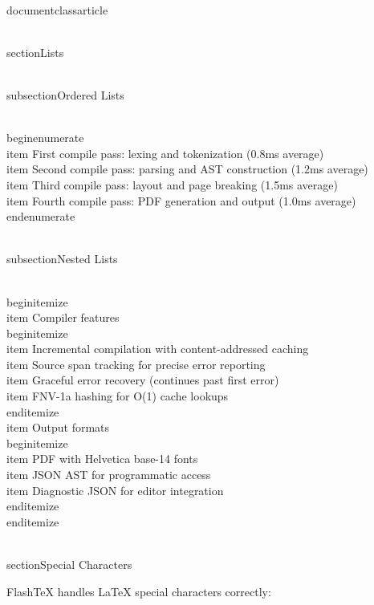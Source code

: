 \\documentclass{article}
\begin{document}
\\section{Lists}

\\subsection{Ordered Lists}

\\begin{enumerate}
  \\item First compile pass: lexing and tokenization (0.8ms average)
  \\item Second compile pass: parsing and AST construction (1.2ms average)
  \\item Third compile pass: layout and page breaking (1.5ms average)
  \\item Fourth compile pass: PDF generation and output (1.0ms average)
\\end{enumerate}

\\subsection{Nested Lists}

\\begin{itemize}
  \\item Compiler features
    \\begin{itemize}
      \\item Incremental compilation with content-addressed caching
      \\item Source span tracking for precise error reporting
      \\item Graceful error recovery (continues past first error)
      \\item FNV-1a hashing for O(1) cache lookups
    \\end{itemize}
  \\item Output formats
    \\begin{itemize}
      \\item PDF with Helvetica base-14 fonts
      \\item JSON AST for programmatic access
      \\item Diagnostic JSON for editor integration
    \\end{itemize}
\\end{itemize}

\\section{Special Characters}

FlashTeX handles LaTeX special characters correctly:
\end{document}
